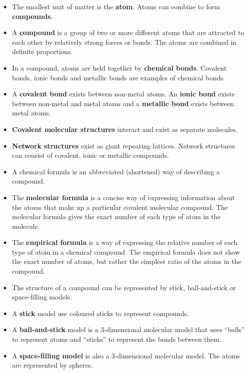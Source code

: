 \begin{itemize}[noitemsep]
\item The smallest unit of matter is the \textbf{atom}. Atoms can combine to form \textbf{compounds}.
\item A \textbf{compound} is a group of two or more different atoms that are attracted to each other by relatively strong forces or bonds. The atoms are combined in definite proportions.
\item In a compound, atoms are held together by \textbf{chemical bonds}. Covalent bonds, ionic bonds and metallic bonds are examples of chemical bonds.
\item A \textbf{covalent bond} exists between non-metal atoms. An \textbf{ionic bond} exists between non-metal and metal atoms and a \textbf{metallic bond} exists between metal atoms.
\item \textbf{Covalent molecular structures} interact and exist as separate molecules.
\item \textbf{Network structures} exist as giant repeating lattices. Network structures can consist of covalent, ionic or metallic compounds. 
\item A chemical formula is an abbreviated (shortened) way of describing a compound.
\item The \textbf{molecular formula} is a concise way of expressing information about the atoms that make up a particular covalent molecular compound. The molecular formula gives the exact number of each type of atom in the molecule.
\item The \textbf{empirical formula} is a way of expressing the relative number of each type of atom in a chemical compound. The empirical formula does not show the exact number of atoms, but rather the simplest ratio of the atoms in the compound.
\item The structure of a compound can be represented by stick, ball-and-stick or space-filling models.
\item A \textbf{stick} model use coloured sticks to represent compounds.
\item A \textbf{ball-and-stick} model is a 3-dimensional molecular
  model that uses ``balls'' to represent atoms and ``sticks'' to represent the bonds between them.
\item A \textbf{space-filling model} is also a 3-dimensional molecular model. The atoms are represented by spheres.
\end{itemize}
\label{m38120*secfhsst!!!underscore!!!id497}
